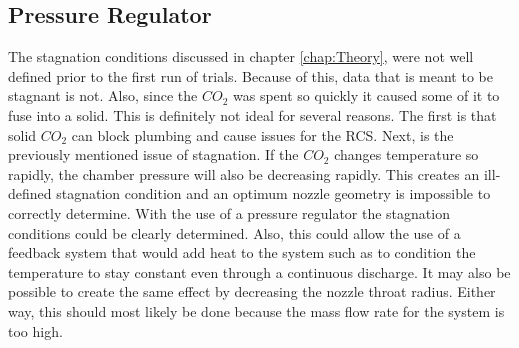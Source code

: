 \subsection{Pressure Regulator}
The stagnation conditions discussed in chapter \ref{chap:Theory}, were not well defined prior to the first run of trials. Because of this, data that is meant to be stagnant is not. Also, since the $CO_2$ was spent so quickly it caused some of it to fuse into a solid. This is definitely not ideal for several reasons. The first is that solid $CO_2$ can block plumbing and cause issues for the RCS. Next, is the previously mentioned issue of stagnation. If the $CO_2$ changes temperature so rapidly, the chamber pressure will also be decreasing rapidly. This creates an ill-defined stagnation condition and an optimum nozzle geometry is impossible to correctly determine. With the use of a pressure regulator the stagnation conditions could be clearly determined. Also, this could allow the use of a feedback system that would add heat to the system such as to condition the temperature to stay constant even through a continuous discharge. It may also be possible to create the same effect by decreasing the nozzle throat radius. Either way, this should most likely be done because the mass flow rate for the system is too high.\\